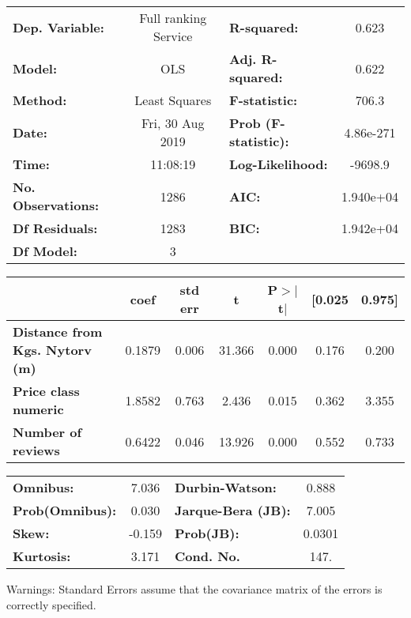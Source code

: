 \documentclass{report}
\begin{document}
\begin{center}
\begin{tabular}{lclc}
\toprule
\textbf{Dep. Variable:}                & Full ranking Service & \textbf{  R-squared:         } &     0.623   \\
\textbf{Model:}                        &         OLS          & \textbf{  Adj. R-squared:    } &     0.622   \\
\textbf{Method:}                       &    Least Squares     & \textbf{  F-statistic:       } &     706.3   \\
\textbf{Date:}                         &   Fri, 30 Aug 2019   & \textbf{  Prob (F-statistic):} & 4.86e-271   \\
\textbf{Time:}                         &       11:08:19       & \textbf{  Log-Likelihood:    } &   -9698.9   \\
\textbf{No. Observations:}             &          1286        & \textbf{  AIC:               } & 1.940e+04   \\
\textbf{Df Residuals:}                 &          1283        & \textbf{  BIC:               } & 1.942e+04   \\
\textbf{Df Model:}                     &             3        & \textbf{                     } &             \\
\bottomrule
\end{tabular}
\begin{tabular}{lcccccc}
                                       & \textbf{coef} & \textbf{std err} & \textbf{t} & \textbf{P$>$$|$t$|$} & \textbf{[0.025} & \textbf{0.975]}  \\
\midrule
\textbf{Distance from Kgs. Nytorv (m)} &       0.1879  &        0.006     &    31.366  &         0.000        &        0.176    &        0.200     \\
\textbf{Price class numeric}           &       1.8582  &        0.763     &     2.436  &         0.015        &        0.362    &        3.355     \\
\textbf{Number of reviews}             &       0.6422  &        0.046     &    13.926  &         0.000        &        0.552    &        0.733     \\
\bottomrule
\end{tabular}
\begin{tabular}{lclc}
\textbf{Omnibus:}       &  7.036 & \textbf{  Durbin-Watson:     } &    0.888  \\
\textbf{Prob(Omnibus):} &  0.030 & \textbf{  Jarque-Bera (JB):  } &    7.005  \\
\textbf{Skew:}          & -0.159 & \textbf{  Prob(JB):          } &   0.0301  \\
\textbf{Kurtosis:}      &  3.171 & \textbf{  Cond. No.          } &     147.  \\
\bottomrule
\end{tabular}
\end{center}

Warnings: \newline
 [1] Standard Errors assume that the covariance matrix of the errors is correctly specified.
\end{document}
